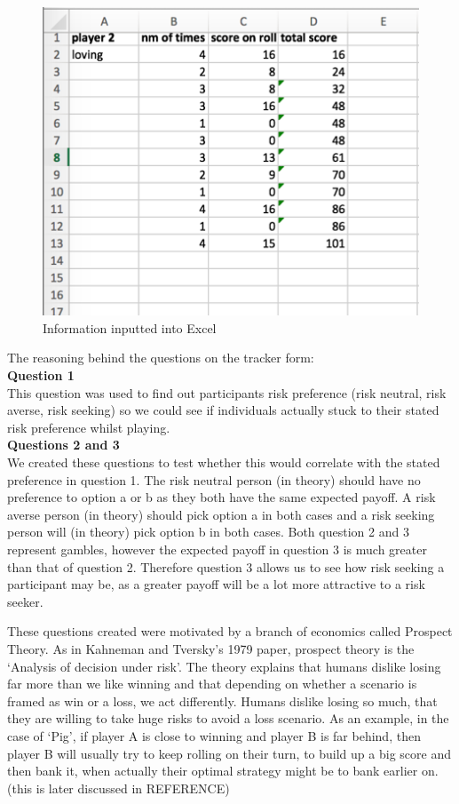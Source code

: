 \documentclass[a4paper,titlepage]{article}
\begin{document}
\begin{figure}
\center
\includegraphics[scale=1]{excel_1}
\caption{Information inputted into Excel\label{figure6}}
\end{figure}
The reasoning behind the questions on the tracker form:\\
\textbf{Question 1}\\This question was used to find out participants risk preference (risk neutral, risk averse, risk seeking) so we could see if individuals actually stuck to their stated risk preference whilst playing.\\ \textbf{Questions 2 and 3}\\We created these questions to test whether this would correlate with the stated preference in question 1. The risk neutral person (in theory) should have no preference to option a or b as they both have the same expected payoff. A risk averse person (in theory) should pick option a in both cases and a risk seeking person will (in theory) pick option b in both cases. Both question 2 and 3 represent gambles, however the expected payoff in question 3 is much greater than that of question 2. Therefore question 3 allows us to see how risk seeking a participant may be, as a greater payoff will be a lot more attractive to a risk seeker.

These questions created were motivated by a branch of economics called Prospect Theory. As in Kahneman and Tversky’s 1979 paper, prospect theory is the ‘Analysis of decision under risk’\cite{kahneman2013prospect}. The theory explains that humans dislike losing far more than we like winning and that depending on whether a scenario is framed as win or a loss, we act differently. Humans dislike losing so much, that they are willing to take huge risks to avoid a loss scenario. As an example, in the case of ‘Pig’, if player A is close to winning and player B is far behind, then player B will usually try to keep rolling on their turn, to build up a big score and then bank it, when actually their optimal strategy might be to bank earlier on. (this is later discussed in REFERENCE)
\end{document}
